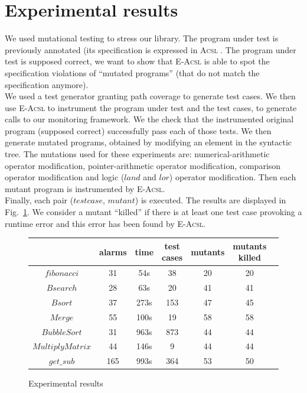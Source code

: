 \documentclass[a4paper,11pt]{article}
\begin{document}
\section{Experimental results}

We used mutational testing to stress our library. The program under test is
previously annotated (its specification is expressed in \textsc{Acsl}
\cite{ACSL}. The program under test is supposed correct, we want to show that
\textsc{E-Acsl} is able to spot the specification violations of
 ``mutated programs'' (that do not match the specification anymore).\\

We used a test generator granting path coverage \cite{PathCrawler}
to generate test cases. We then use \textsc{E-Acsl} to instrument the program
under test and the test cases, to generate calls to our monitoring framework.
We the check that the instrumented original program (supposed correct)
successfully pass each of those tests. We then generate mutated programs,
obtained by modifying an element in the syntactic tree. The mutations used for
these experiments are: numerical-arithmetic operator modification,
pointer-arithmetic operator modification, comparison operator modification
and logic ($land$ and $lor$) operator modification. Then each mutant program is
instrumented by \textsc{E-Acsl}.\\

Finally, each pair ($test case$, $mutant$) is executed. The results are
displayed in Fig.~\ref{fig:exp}. We consider a mutant ``killed'' if there is at
least one test case provoking a runtime error and this error has been found by
\textsc{E-Acsl}.

\begin{figure}[h]
  \centering
  \begin{tabular}{|c|c|c|c|c|c|c|}
    \hline
    & alarms & time & test cases & mutants & mutants killed \\
    \hline
    $fibonacci$ & 31 & 54s & 38 & 20 & 20 \\
    \hline
    $Bsearch$ & 28 & 63s & 20 & 41 & 41 \\
    \hline
    $Bsort$ & 37 & 273s & 153 & 47 & 45 \\
    \hline
    $Merge$ & 55 & 100s & 19 & 58 & 58 \\
    \hline
    $BubbleSort$ & 31 & 963s & 873 & 44 & 44 \\
    \hline
    $MultiplyMatrix$ & 44 & 146s & 9 & 44 & 44 \\
    \hline
    $get\_sub$ & 165 & 993s & 364 & 53 & 50 \\
    \hline
  \end{tabular}
  \caption{Experimental results}
  \label{fig:exp}
\end{figure}~\\
\end{document}
